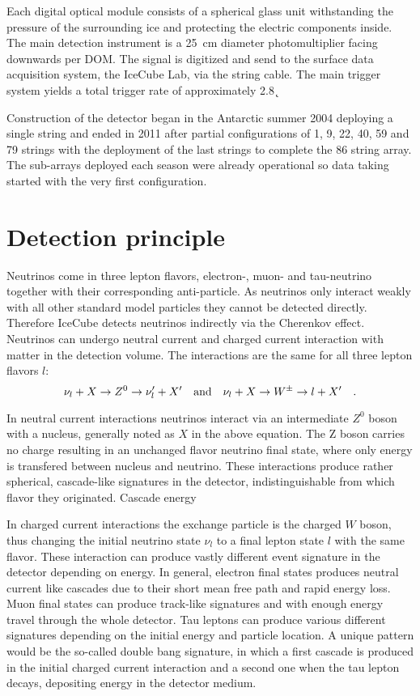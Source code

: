 Each digital optical module consists of a spherical glass unit withstanding the pressure of the surrounding ice and protecting the electric components inside.
The main detection instrument is a \SI{25}{\cm} diameter photomultiplier facing downwards per DOM.
The signal is digitized and send to the surface data acquisition system, the IceCube Lab, via the string cable.
The main trigger system yields a total trigger rate of approximately \SI{2.8}{\k\Hz}

Construction of the detector began in the Antarctic summer 2004 deploying a single string and ended in 2011 after partial configurations of 1, 9, 22, 40, 59 and 79 strings with the deployment of the last strings to complete the 86 string array.
The sub-arrays deployed each season were already operational so data taking started with the very first configuration.

\section{Detection principle}
Neutrinos come in three lepton flavors, electron-, muon- and tau-neutrino together with their corresponding anti-particle.
As neutrinos only interact weakly with all other standard model particles they cannot be detected directly.
Therefore IceCube detects neutrinos indirectly via the Cherenkov effect.
Neutrinos can undergo neutral current and charged current interaction with matter in the detection volume.
The interactions are the same for all three lepton flavors $l$:
\begin{equation}
  \nu_l + X \rightarrow Z^0 \rightarrow \nu'_l + X'
  \quad\text{and}\quad
  \nu_l + X \rightarrow W^{\pm} \rightarrow l + X'
  \quad\text{.}
\end{equation}

In neutral current interactions neutrinos interact via an intermediate $Z^0$ boson with a nucleus, generally noted as $X$ in the above equation.
The Z boson carries no charge resulting in an unchanged flavor neutrino final state, where only energy is transfered between nucleus and neutrino.
These interactions produce rather spherical, cascade-like signatures in the detector, indistinguishable from which flavor they originated.
Cascade energy

In charged current interactions the exchange particle is the charged $W$ boson, thus changing the initial neutrino state $\nu_l$ to a final lepton state $l$ with the same flavor.
These interaction can produce vastly different event signature in the detector depending on energy.
In general, electron final states produces neutral current like cascades due to their short mean free path and rapid energy loss.
Muon final states can produce track-like signatures and with enough energy travel through the whole detector.
Tau leptons can produce various different signatures depending on the initial energy and particle location.
A unique pattern would be the so-called double bang signature, in which a first cascade is produced in the initial charged current interaction and a second one when the tau lepton decays, depositing energy in the detector medium.

